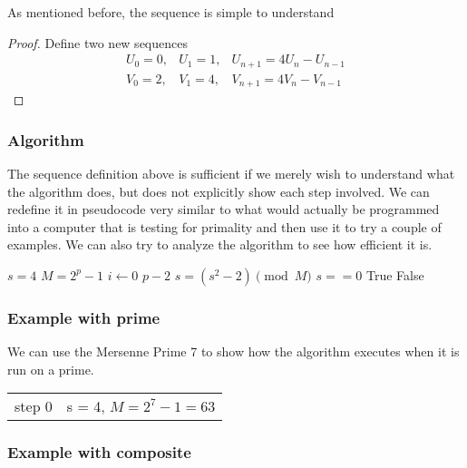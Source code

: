 As mentioned before, the sequence is simple to understand 

\begin{proof}
Define two new sequences
\begin{align}
U_0 = 0,& U_1 = 1,& U_{n+1} = 4U_n - U_{n-1}\\ 
V_0 = 2,& V_1 = 4,& V_{n+1} = 4V_n - V_{n-1}
\end{align}
\end{proof}



\subsubsection{Algorithm}

The sequence definition above is sufficient if we merely wish to understand what the algorithm does, but does not explicitly show each step involved.  We can redefine it in pseudocode very similar to what would actually be programmed into a computer that is testing for primality and then use it to try a couple of examples. We can also try to analyze the algorithm to see how efficient it is.

\begin{codebox}
\li$s = 4$
\li$M = 2^p - 1$
\li \For $i \gets 0$ \To $p - 2$
\Do\li
$s = (s^2 - 2) \pmod{M}$
\End\li
\If $s == 0$
\Then
\li\Return True \li
\Else
\li\Return False \li
\End
\end{codebox}

\subsubsection{Example with prime}

We can use the Mersenne Prime 7 to show how the algorithm executes when it is run on a prime.
\begin{tabular}{ll}
step 0&s = 4, $M = 2^7 -1 = 63$
\end{tabular}

\subsubsection{Example with composite} 

